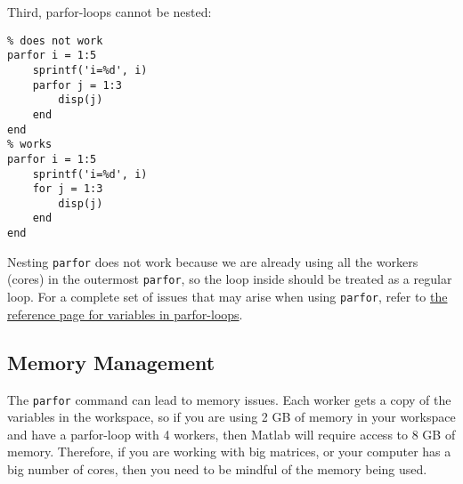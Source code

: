 \documentclass[12pt, a4paper]{article}
\begin{document}
Third, parfor-loops cannot be nested:
\lstset{language=matlab,label= ,caption= ,captionpos=b,firstnumber=1,numbers=left,style=Matlab-editor}
\begin{lstlisting}
% does not work
parfor i = 1:5
    sprintf('i=%d', i)
    parfor j = 1:3
        disp(j)
    end
end
% works
parfor i = 1:5
    sprintf('i=%d', i)
    for j = 1:3
        disp(j)
    end
end
\end{lstlisting}
Nesting \texttt{parfor} does not work because we are already using all the workers (cores) in the outermost \texttt{parfor}, so the loop inside should be treated as a regular loop.
For a complete set of issues that may arise when using \texttt{parfor}, refer to \href{https://www.mathworks.com/help/parallel-computing/troubleshoot-variables-in-parfor-loops.html}{the reference page for variables in parfor-loops}.
\subsection{Memory Management}
\label{sec:org157c0a9}
The \texttt{parfor} command can lead to memory issues.
Each worker gets a copy of the variables in the workspace, so if you are using 2 GB of memory in your workspace and have a parfor-loop with 4 workers, then Matlab will require access to 8 GB of memory.
Therefore, if you are working with big matrices, or your computer has a big number of cores, then you need to be mindful of the memory being used.
\end{document}
